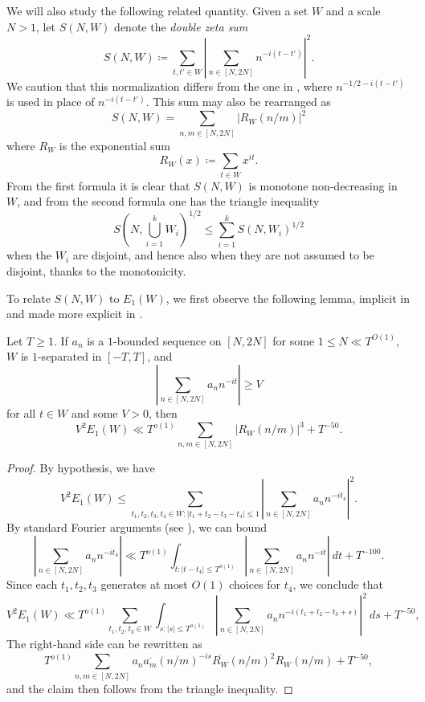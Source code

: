 We will also study the following related quantity.  Given a set $W$ and a scale $N>1$, let $S(N,W)$ denote the \emph{double zeta sum}
$$ S(N,W) \coloneqq \sum_{t,t' \in W} |\sum_{n \in [N,2N]} n^{-i(t-t')}|^2.$$
We caution that this normalization differs from the one in \cite{ivic}, where $n^{-1/2-i(t-t')}$ is used in place of $n^{-i(t-t')}$.  This sum may also be rearranged as
$$ S(N,W) = \sum_{n,m \in [N,2N]} |R_W(n/m)|^2$$
where $R_W$ is the exponential sum
$$ R_W(x) \coloneqq \sum_{t \in W} x^{it}.$$
From the first formula it is clear that $S(N,W)$ is monotone non-decreasing in $W$, and from the second formula one has the triangle inequality
$$ S(N, \bigcup_{i=1}^k W_i)^{1/2} \leq \sum_{i=1}^k S(N,W_i)^{1/2}$$
when the $W_i$ are disjoint, and hence also when they are not assumed to be disjoint, thanks to the monotonicity.

To relate $S(N,W)$ to $E_1(W)$, we first observe the following lemma, implicit in \cite{heath_brown_consecutive_II} and made more explicit in \cite[Lemma 11.4]{guth-maynard}.

\begin{lemma} Let $T \geq 1$. If $a_n$ is a $1$-bounded sequence on $[N,2N]$ for some $1 \leq N \ll T^{O(1)}$, $W$ is $1$-separated in $[-T,T]$, and
$$|\sum_{n \in [N,2N]} a_n n^{-it}| \geq V$$
for all $t \in W$ and some $V>0$, then
$$ V^2 E_1(W) \ll T^{o(1)} \sum_{n,m \in [N,2N]} |R_W(n/m)|^3 + T^{-50}.$$
\end{lemma}

\begin{proof} By hypothesis, we have
$$ V^2 E_1(W) \leq \sum_{t_1,t_2,t_3,t_4 \in W: |t_1+t_2-t_3-t_4| \leq 1} |\sum_{n \in [N,2N]} a_n n^{-it_4}|^2.$$
By standard Fourier arguments (see \cite[Lemma 11.3]{guth-maynard}), we can bound
$$ |\sum_{n \in [N,2N]} a_n n^{-it_4}| \ll T^{o(1)} \int_{t: |t-t_4| \leq T^{o(1)}} |\sum_{n \in [N,2N]} a_n n^{-it}|\ dt + T^{-100}.$$
Since each $t_1,t_2,t_3$ generates at most $O(1)$ choices for $t_4$, we conclude that
$$ V^2 E_1(W) \ll T^{o(1)} \sum_{t_1,t_2,t_3 \in W} \int_{s: |s| \leq T^{o(1)}}  |\sum_{n \in [N,2N]} a_n n^{-i(t_1+t_2-t_3+s)}|^2\ ds + T^{-50},$$
The right-hand side can be rewritten as
$$ T^{o(1)} \sum_{n,m \in [N,2N]} a_n \overline{a_m} (n/m)^{-is} \overline{R_W}(n/m)^2 R_W(n/m) + T^{-50},$$
and the claim then follows from the triangle inequality.
\end{proof}

